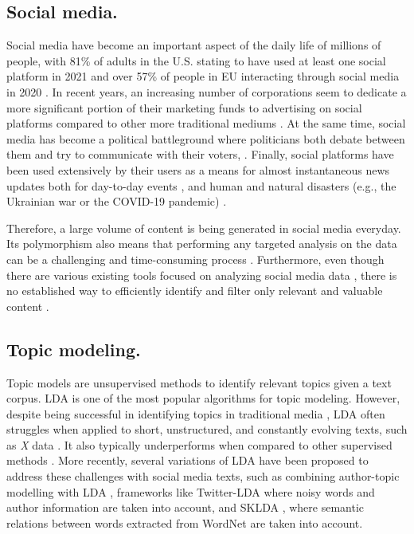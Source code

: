 \subsection{Social media.}
Social media have become an important aspect of the daily life of millions of people, with 81\% of adults in the U.S. stating to have used at least one social platform 
in 2021 \cite{auxier2021social} and over 57\% of people in EU interacting through social media in 2020 \cite{eurostat}. In recent years, an increasing number of corporations seem to dedicate a more significant portion of their marketing funds to advertising on social platforms compared to other more traditional mediums \cite{eid2020internet}. At the same time, social media has become a political battleground where politicians both debate between them and try to communicate with their voters, \cite{stier2018election, llewellyn2016brexit}. Finally, social platforms have been used extensively by their users as a means for almost instantaneous news updates both for day-to-day events \cite{hermida2012social}, and human and natural disasters (e.g., the Ukrainian war or the COVID-19 pandemic) \cite{khaldarova2016fake, banda2021large}.

Therefore, a large volume of content is being generated in social media everyday.  
Its polymorphism also means that performing any targeted analysis on the data can be a challenging and time-consuming process \cite{weller2015accepting, stieglitz2018social}. Furthermore, even though there are various existing tools focused on analyzing social media data \cite{batrinca2015social}, there is no established way to efficiently identify and filter only relevant and valuable content \cite{nugroho2020survey}. 

\subsection{Topic modeling.} Topic models are unsupervised methods to identify relevant topics given a text corpus. \ac{LDA} \cite{lda} is one of the most popular algorithms for topic modeling. However, despite being successful in identifying topics in traditional media \cite{martin2015more, el2021end}, \ac{LDA} often struggles when applied to short, unstructured, and constantly evolving texts, such as \textit{X} data \cite{zhao2011comparing}. It also typically underperforms when compared to other supervised methods \cite{arias2015ieee}. More recently, several variations of \ac{LDA} have been proposed to address these challenges with social media texts, such as combining author-topic modelling with \ac{LDA} \cite{rosen2004author,steinskog-etal-2017-twitter}, frameworks like Twitter-LDA \cite{zhao2011comparing} where noisy words and author information are taken into account, and SKLDA \cite{tajbakhsh2019semantic}, where semantic relations between words extracted from WordNet are taken into account.


